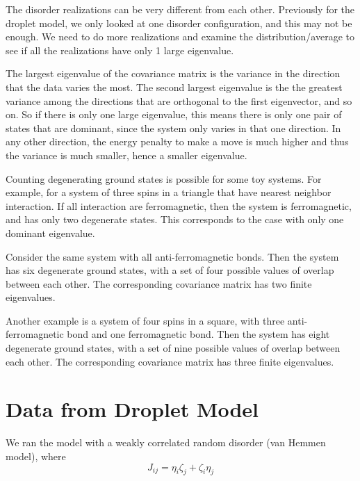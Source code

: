 The disorder realizations can be very different from each other. 
Previously for the droplet model,
we only looked at one disorder configuration, and this may not be enough. 
We need to do more realizations and examine the distribution/average to see
if all the realizations have only 1 large eigenvalue. 

The largest eigenvalue of the covariance matrix is the variance in the 
direction that the data varies the most. The second largest eigenvalue is the 
the greatest variance among the directions that are orthogonal 
to the first eigenvector, and so on. So if there is only one large eigenvalue,
this means there is only one pair of states that are dominant, since the system
only varies in that one direction. In any other direction, the energy penalty 
to make a move is much higher and thus the variance is much smaller, hence 
a smaller eigenvalue.

Counting degenerating ground states is possible for some toy systems. 
For example, for a system of three spins in a triangle that have nearest 
neighbor interaction. If all interaction are ferromagnetic, then the system is
ferromagnetic, and has only two degenerate states. This corresponds to the 
case with only one dominant eigenvalue.


Consider the same system with all anti-ferromagnetic bonds. Then the system has
six degenerate ground states, with a set of four possible values of 
overlap between each other. The corresponding covariance matrix has two finite 
eigenvalues. 

Another example is a system of four spins in a square, with three 
anti-ferromagnetic bond and one ferromagnetic bond.
Then the system has eight degenerate ground states, with a set of nine possible 
values of overlap between each other. The corresponding covariance matrix has 
three finite eigenvalues. 



\section{Data from Droplet Model}
We ran the model with a weakly correlated random disorder (van Hemmen model),
where
\[
J_{ij}=\eta_i\zeta_j+\zeta_i\eta_j
\]

